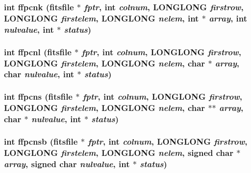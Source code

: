 \subsubsection{\setlength{\rightskip}{0pt plus 5cm}int ffpcnk (\bf{fitsfile} $\ast$ {\em fptr}, int {\em colnum}, \bf{LONGLONG} {\em firstrow}, \bf{LONGLONG} {\em firstelem}, \bf{LONGLONG} {\em nelem}, int $\ast$ {\em array}, int {\em nulvalue}, int $\ast$ {\em status})}\label{test_2shm__client_2fitsio_8h_d93fc5e0ad1ffc1672875c4cd27ce94d}


\subsubsection{\setlength{\rightskip}{0pt plus 5cm}int ffpcnl (\bf{fitsfile} $\ast$ {\em fptr}, int {\em colnum}, \bf{LONGLONG} {\em firstrow}, \bf{LONGLONG} {\em firstelem}, \bf{LONGLONG} {\em nelem}, char $\ast$ {\em array}, char {\em nulvalue}, int $\ast$ {\em status})}\label{test_2shm__client_2fitsio_8h_02845255614e2b0e1dce064727cd2303}


\subsubsection{\setlength{\rightskip}{0pt plus 5cm}int ffpcns (\bf{fitsfile} $\ast$ {\em fptr}, int {\em colnum}, \bf{LONGLONG} {\em firstrow}, \bf{LONGLONG} {\em firstelem}, \bf{LONGLONG} {\em nelem}, char $\ast$$\ast$ {\em array}, char $\ast$ {\em nulvalue}, int $\ast$ {\em status})}\label{test_2shm__client_2fitsio_8h_ee8210b9d65f49d0cd026caec5413005}


\subsubsection{\setlength{\rightskip}{0pt plus 5cm}int ffpcnsb (\bf{fitsfile} $\ast$ {\em fptr}, int {\em colnum}, \bf{LONGLONG} {\em firstrow}, \bf{LONGLONG} {\em firstelem}, \bf{LONGLONG} {\em nelem}, signed char $\ast$ {\em array}, signed char {\em nulvalue}, int $\ast$ {\em status})}\label{test_2shm__client_2fitsio_8h_a9318e38faa87bac57112d69f6c1a58b}


